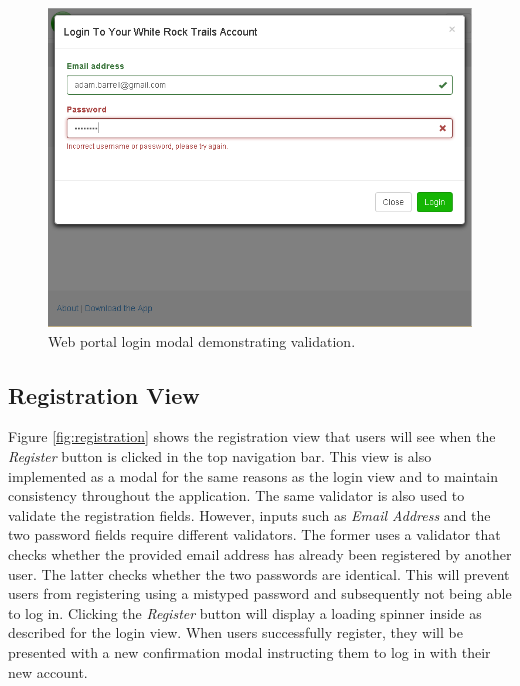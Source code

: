 \documentclass[11pt,a4paper]{article}
\begin{document}
\begin{figure}[H]
\centering
\includegraphics[width=0.8\linewidth]{./img/webportal/login}
\caption{Web portal login modal demonstrating validation.}
\label{fig:login}
\end{figure}

\subsection{Registration View}

Figure \ref{fig:registration} shows the registration view that users will see when the \emph{Register} button is clicked in the top navigation bar. This view is also implemented as a modal for the same reasons as the login view and to maintain consistency throughout the application. The same validator is also used to validate the registration fields. However, inputs such as \emph{Email Address} and the two password fields require different validators. The former uses a validator that checks whether the provided email address has already been registered by another user. The latter checks whether the two passwords are identical. This will prevent users from registering using a mistyped password and subsequently not being able to log in. Clicking the \emph{Register} button will display a loading spinner inside as described for the login view. When users successfully register, they will be presented with a new confirmation modal instructing them to log in with their new account.
\end{document}
